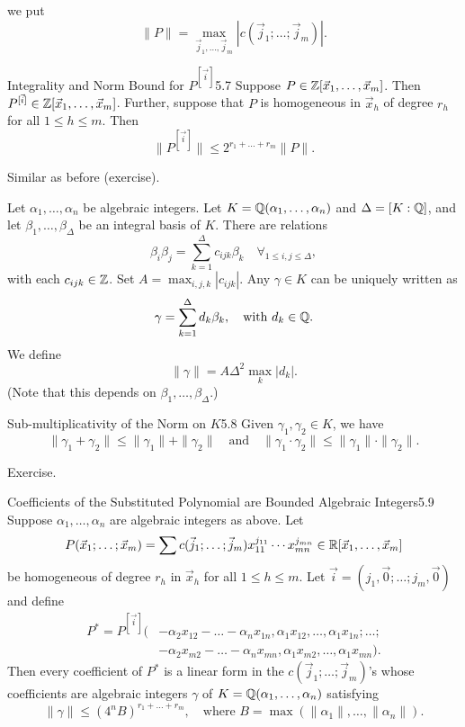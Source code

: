 \documentclass{Vorlesungstemplate_English} %
\begin{document}
we put
\[ \|P\| = \max_{\vec j_1, \dots, \vec j_m}|c(\vec j_1; \dots; \vec j_m)|.\]
\begin{lemma}[coltitle=orange]{\color{orange} Integrality and Norm Bound for $P^{[\vec i]}$}{5.7}
  \color{orange} Suppose $P \in \mathbb{Z}[\vec x_1, \dots, \vec x_m]$. Then $P^{[\vec i]} \in \mathbb{Z}[\vec x_1, \dots, \vec x_m]$. Further, suppose that $P$ is homogeneous in $\vec x_h$ of degree $r_h$ for all $1 \leq h \leq m$. Then
  \[ \|P^{[\vec i]}\| \leq 2^{r_1 + \dots + r_m}\|P\|.\]
\end{lemma}
\begin{colorpf}
  \color{orange}Similar as before (exercise).
\end{colorpf}
\noindent Let $\alpha_1, \dots, \alpha_n$ be algebraic integers. Let $K = \mathbb{Q}(\alpha_1, \dots, \alpha_n)$ and $\Delta = [K : \mathbb{Q}]$, and let $\beta_1, \dots, \beta_{\Delta}$ be an integral basis of $K$. There are relations
\[ \beta_i\beta_j = \sum_{k=1}^{\Delta}c_{ijk}\beta_k \quad \forall_{1 \leq i, j \leq \Delta},\]
with each $c_{ijk} \in \mathbb{Z}$. Set $A = \max_{i,j,k}|c_{ijk}|$. Any $\gamma \in K$ can be uniquely written as
\[ \gamma = \sum_{k=1}^{\Delta}d_k\beta_k, \quad \text{with } d_k \in \mathbb{Q}.\]
We define
\[ \|\gamma\| = A\Delta^2\max_k|d_k|.\]
(Note that this depends on $\beta_1, \dots, \beta_{\Delta}$.)
\begin{lemma}[coltitle=orange]{\color{orange} Sub-multiplicativity of the Norm on $K$}{5.8}
  \color{orange} Given $\gamma_1, \gamma_2 \in K$, we have
  \[ \|\gamma_1 + \gamma_2\| \leq \|\gamma_1\| + \|\gamma_2\| \quad \text{and} \quad \|\gamma_1\cdot\gamma_2\| \leq \|\gamma_1\|\cdot\|\gamma_2\|.\]
\end{lemma}
\begin{colorpf}
  Exercise.
\end{colorpf}
\begin{lemma}[coltitle=orange]{\color{orange} Coefficients of the Substituted Polynomial are Bounded Algebraic Integers}{5.9}
  \color{orange} Suppose $\alpha_1, \dots, \alpha_n$ are algebraic integers as above. Let
  \[ P(\vec x_1; \dots; \vec x_m) = \sum c(\vec j_1; \dots; \vec j_m)x_{11}^{j_{11}}\cdots x_{mn}^{j_{mn}} \in \mathbb{R}[\vec x_1, \dots, \vec x_m]\]
  be homogeneous of degree $r_h$ in $\vec x_h$ for all $1 \leq h \leq m$. Let $\vec i = (j_1, \vec 0; \dots; j_m, \vec 0)$ and \color{orange} define
  \begin{align*} P^* = P^{[\vec i]}\big(&-\alpha_2 x_{12} - \dots - \alpha_n x_{1n}, \alpha_1 x_{12}, \dots, \alpha_1 x_{1n}; \dots; \\ &-\alpha_2 x_{m2} - \dots - \alpha_n x_{mn}, \alpha_1 x_{m2}, \dots, \alpha_1 x_{mn}\big).\end{align*}
  Then every coefficient of $P^*$ is a linear form in the $c(\vec j_1; \dots; \vec j_m)$'s whose coefficients are algebraic integers $\gamma$ of $K = \mathbb{Q}(\alpha_1, \dots, \alpha_n)$ satisfying
  \[ \|\gamma\| \leq (4^n B)^{r_1 + \dots + r_m}, \quad \text{where } B = \max(\|\alpha_1\|, \dots, \|\alpha_n\|).\]
\end{lemma}
\end{document}
